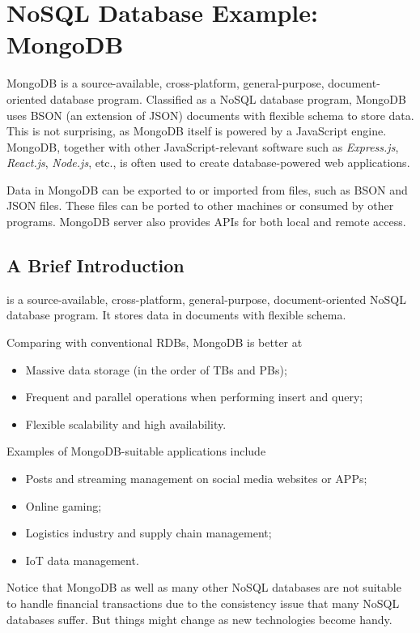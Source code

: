 \chapter{NoSQL Database Example: MongoDB}

MongoDB is a source-available, cross-platform, general-purpose, document-oriented database program. Classified as a NoSQL database program, MongoDB uses BSON (an extension of JSON) documents with flexible schema to store data. This is not surprising, as MongoDB itself is powered by a JavaScript engine. MongoDB, together with other JavaScript-relevant software such as \textit{Express.js}, \textit{React.js}, \textit{Node.js}, etc., is often used to create database-powered web applications.

Data in MongoDB can be exported to or imported from files, such as BSON and JSON files. These files can be ported to other machines or consumed by other programs. MongoDB server also provides APIs for both local and remote access. 

\section{A Brief Introduction}

 is a source-available, cross-platform, general-purpose, document-oriented NoSQL database program. It stores data in documents with flexible schema.

Comparing with conventional RDBs, MongoDB is better at
\begin{itemize}
	\item Massive data storage (in the order of TBs and PBs);
	\item Frequent and parallel operations when performing insert and query;
	\item Flexible scalability and high availability.
\end{itemize}

Examples of MongoDB-suitable applications include
\begin{itemize}
	\item Posts and streaming management on social media websites or APPs;
	\item Online gaming;
	\item Logistics industry and supply chain management;
	\item IoT data management.
\end{itemize}

Notice that MongoDB as well as many other NoSQL databases are not suitable to handle financial transactions due to the consistency issue that many NoSQL databases suffer. But things might change as new technologies become handy.

